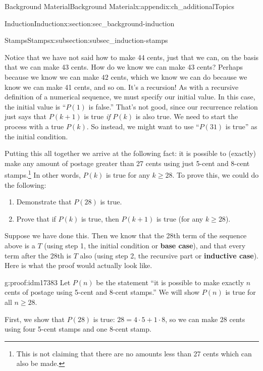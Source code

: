 \documentclass[oneside,10pt,]{book}
\newcommand{\terminology}[1]{\textbf{#1}}
\numberwithin{equation}{chapter}
\begin{document}
\begin{appendixptx}{Background Material}{}{Background Material}{}{}{x:appendix:ch_additionalTopics}
\begin{sectionptx}{Induction}{}{Induction}{}{}{x:section:sec_background-induction}
\begin{subsectionptx}{Stamps}{}{Stamps}{}{}{x:subsection:subsec_induction-stamps}
\par
Notice that we have not said how to make 44 cents, just that we can, on the basis that we can make 43 cents. How do we know we can make 43 cents? Perhaps because we know we can make \(42\)\label{g:notation:idm17354} cents, which we know we can do because we know we can make 41 cents, and so on. It's a recursion! As with a recursive definition of a numerical sequence, we must specify our initial value. In this case, the initial value is ``\(P(1)\) is false.'' That's not good, since our recurrence relation just says that \(P(k+1)\) is true \emph{if} \(P(k)\) is also true. We need to start the process with a true \(P(k)\). So instead, we might want to use ``\(P(31)\) is true'' as the initial condition.%
\par
Putting this all together we arrive at the following fact: it is possible to (exactly) make any amount of postage greater than 27 cents using just 5-cent and 8-cent stamps.\footnote{This is not claiming that there are no amounts less than 27 cents which can also be made.\label{g:fn:idm17366}} In other words, \(P(k)\) is true for any \(k \ge 28\). To prove this, we could do the following:%
\begin{enumerate}
\item{}Demonstrate that \(P(28)\) is true.%
\item{}Prove that if \(P(k)\) is true, then \(P(k+1)\) is true (for any \(k \ge 28\)).%
\end{enumerate}
%
\par
Suppose we have done this. Then we know that the 28th term of the sequence above is a \(T\) (using step 1, the initial condition or \terminology{base case}), and that every term after the 28th is \(T\) also (using step 2, the recursive part or \terminology{inductive case}). Here is what the proof would actually look like.%
\begin{proofptx}{}{g:proof:idm17383}
Let \(P(n)\) be the statement ``it is possible to make exactly \(n\) cents of postage using 5-cent and 8-cent stamps.'' We will show \(P(n)\) is true for all \(n \ge 28\).%
\par
First, we show that \(P(28)\) is true: \(28 =  4 \cdot 5+ 1\cdot 8\), so we can make \(28\) cents using four 5-cent stamps and one 8-cent stamp.%
\par

\end{proofptx}
\end{subsectionptx}
\end{sectionptx}
\end{appendixptx}
\end{document}
